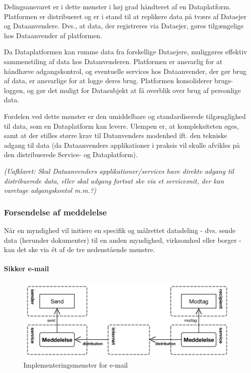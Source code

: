Delingsansvaret er i dette mønster i høj grad håndteret af en
Dataplatform. Platformen er distribueret og er i stand til at replikere
data på tværs af Dataejer og Dataanvendere. Dvs., at data, der
registreres via Dataejer, gøres tilgængelige hos Dataanvender af
platformen.

Da Dataplatformen kan rumme data fra forskellige Dataejere, muliggøres
effektiv sammenstiling af data hos Datanvenderen. Platformen er
ansvarlig for at håndhæve adgangskontrol, og eventuelle services hos
Dataanvender, der gør brug af data, er ansvarlige for at logge deres
brug. Platformen konsoliderer brugs-loggen, og gør det muligt for
Datasubjekt at få overblik over brug af personlige data.

Fordelen ved dette mønster er den umiddelbare og standardiserede
tilgænglighed til data, som en Dataplatform kan levere. Ulempen er, at
kompleksiteten øges, samt at der stilles større krav til Datanvenders
modenhed ift. den tekniske adgang til data (da Dataanvenders
applikationer i praksis vil skulle afvikles på den distribuerede
Service- og Dataplatform).

\emph{(Uafklaret: Skal Dataanvenders applikationer/services have direkte
adgang til distribuerede data, eller skal adgang fortsat ske via et
servicesnit, der kan varetage adgangskontol m.m.?)}

\subsubsection{Forsendelse af
meddelelse}\label{forsendelse-af-meddelelse}

Når en myndighed vil initiere en specifik og målrettet datadeling - dvs.
sende data (herunder dokumenter) til en anden myndighed, virksomhed
eller borger - kan det ske via ét af de tre nedenstående mønstre.

\paragraph{Sikker e-mail}\label{sikker-e-mail}

\begin{figure}
\centering
\includegraphics[width=\textwidth]{figures/send-email.png}
\caption{Implementeringsmønster for e-mail}
\end{figure}

